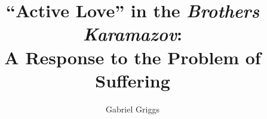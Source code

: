 \documentclass[12pt]{report}
\begin{document}
    
       \graduationmonth{}
       \graduationyear{}
       \author{Gabriel Griggs}
       \committee{}{}{}{}{}
       \title{``Active Love'' in the \emph{Brothers Karamazov}: \\ A Response to the Problem of Suffering}



          \titlepage


\begin{acknowledgements}

     

\end{acknowledgements}
\end{document}
